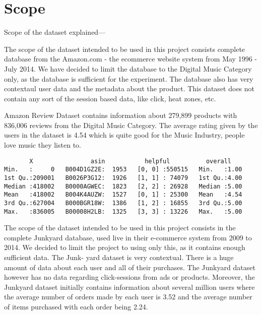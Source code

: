 \section{Scope}

Scope of the dataset explained---

The scope of the dataset intended to be used in this project consists complete database from the Amazon.com - the ecommerce website system from May 1996 - July 2014. We have decided to limit the database to the Digital Music Category only, as the database is sufficient for the experiment. The database also has very contextaul user data and the metadata about the product. This dataset does not contain any sort of the session based data, like click, heat zones, etc.

Amazon Review Dataset contains information about 279,899 products with 836,006 reviews from the Digital Music Category.
The average rating given by the users in the dataset is 4.54 which is quite good for the Music Industry, people love music they listen to.    


\begin{verbatim}
       X                asin           helpful          overall    
Min.   :     0   B004D1GZ2E:  1953   [0, 0] :550515   Min.   :1.00  
1st Qu.:209001   B0026P3G12:  1926   [1, 1] : 74079   1st Qu.:4.00  
Median :418002   B0000AGWEC:  1823   [2, 2] : 26928   Median :5.00  
Mean   :418002   B004K4AUZW:  1527   [0, 1] : 25300   Mean   :4.54  
3rd Qu.:627004   B000BGR18W:  1386   [1, 2] : 16855   3rd Qu.:5.00  
Max.   :836005   B00008H2LB:  1325   [3, 3] : 13226   Max.   :5.00  
\end{verbatim}





The scope of the dataset intended to be used in this project consists in the complete
Junkyard database, used live in their e-commerce system from 2009 to 2014. We decided
to limit the project to using only this, as it contains enough sufficient data. The Junk-
yard dataset is very contextual. There is a huge amount of data about each user and all
of their purchases. The Junkyard dataset however has no data regarding click-sessions
from ads or products.
Moreover, the Junkyard dataset initially contains information about several million users
where the average number of orders made by each user is 3.52 and the average number
of items purchased with each order being 2.24.


